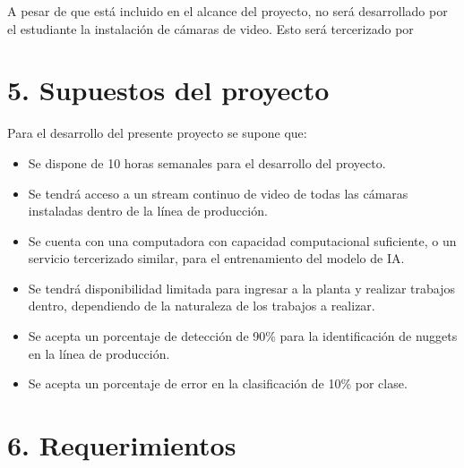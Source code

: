 \documentclass[
11pt, %
]{charter}
\begin{document}
A pesar de que está incluido en el alcance del proyecto, no será desarrollado por el estudiante la instalación de cámaras de video. Esto será tercerizado por \empclientename

\section{5. Supuestos del proyecto}
\label{sec:supuestos}
Para el desarrollo del presente proyecto se supone que:

\begin{itemize}
	\item Se dispone de 10 horas semanales para el desarrollo del proyecto.
	\item Se tendrá acceso a un stream continuo de video de todas las cámaras instaladas dentro de la línea de producción. 
	\item Se cuenta con una computadora con capacidad computacional suficiente, o un servicio tercerizado similar, para el entrenamiento del modelo de IA.
	\item Se tendrá disponibilidad limitada para ingresar a la planta y realizar trabajos dentro, dependiendo de la naturaleza de los trabajos a realizar.
	\item Se acepta un porcentaje de detección de 90\% para la identificación de nuggets en la línea de producción.
	\item Se acepta un porcentaje de error en la clasificación de 10\% por clase.
\end{itemize}

\section{6. Requerimientos}
\label{sec:requerimientos}
\end{document}
